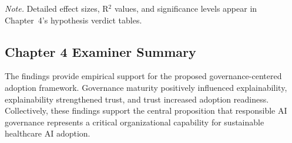 \vspace{0.3em}\noindent\textit{Note.} Detailed effect sizes, R$^2$ values, and significance levels appear in Chapter~4's hypothesis verdict tables.



\subsection{Chapter 4 Examiner Summary}
\label{sec:ch4_examiner_summary}

\noindent The findings provide empirical support for the proposed governance-centered adoption framework. Governance maturity positively influenced explainability, explainability strengthened trust, and trust increased adoption readiness. Collectively, these findings support the central proposition that responsible AI governance represents a critical organizational capability for sustainable healthcare AI adoption.


